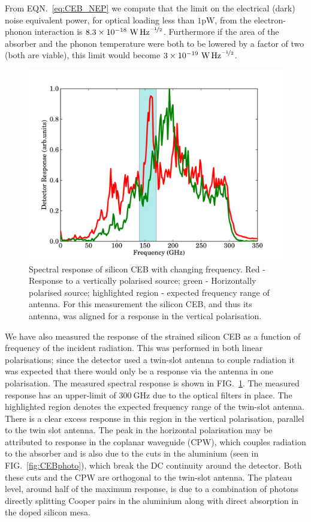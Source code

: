 \documentclass[aip, apl, a4paper, amsmath,amssymb, reprint]{revtex4-1}
\begin{document}
From EQN.~\ref{eq:CEB_NEP} we compute that the limit on the electrical (dark) noise equivalent power, for optical loading less than $1\mathrm{pW}$, from the electron-phonon interaction is $8.3 \times 10^{-18}~\mathrm{\mbox{W\,Hz}^{\nicefrac{-1}{2}}}$. Furthermore if the area of the absorber and the phonon temperature were both to be lowered by a factor of two (both are viable), this limit would become $3 \times 10^{-19}~\mathrm{\mbox{W\,Hz}^{\nicefrac{-1}{2}}}$.
\begin{figure}[ht]
\includegraphics[width = 0.8\columnwidth]{01_FTS_response}
\caption{Spectral response of silicon CEB with changing frequency. Red - Response to a vertically polarised source; green - Horizontally polarised source; highlighted region - expected frequency range of antenna. For this measurement the silicon CEB, and thus its antenna, was aligned for a response in the vertical polarisation.}
\label{fig:FTS_response}
\end{figure}

We have also measured the response of the strained silicon CEB as a function of frequency of the incident radiation. This was performed in both linear polarisations; since the detector used a twin-slot antenna to couple radiation it was expected that there would only be a response via the antenna in one polarisation. The measured spectral response is shown in FIG.~\ref{fig:FTS_response}. The measured response has an upper-limit of $300~\mathrm{GHz}$ due to the optical filters in place. The highlighted region denotes the expected frequency range of the twin-slot antenna. There is a clear excess response in this region in the vertical polarisation, parallel to the twin slot antenna. The peak in the horizontal polarisation may be attributed to response in the coplanar waveguide (CPW), which couples radiation to the absorber and is also due to the cuts in the aluminium (seen in FIG.~\ref{fig:CEBphoto}), which break the DC continuity around the detector. Both these cuts and the CPW are orthogonal to the twin-slot antenna. The plateau level, around half of the maximum response, is due to a combination of photons directly splitting Cooper pairs in the aluminium along with direct absorption in the doped silicon mesa.
\end{document}
